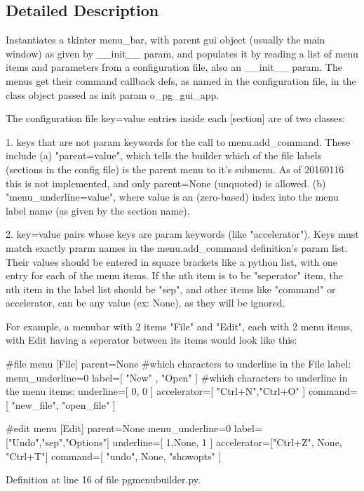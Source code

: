 \subsection{Detailed Description}
\begin{DoxyVerb}Instantiates a tkinter menu_bar, with parent gui object (usually the main window) 
as given by __init__ param, and populates it by reading a list of menu items and 
parameters from a configuration file, also an __init__ param. The menus get their 
command callback defs, as named in the configuration file, in the class object 
passed as init param o_pg_gui_app.

The configuration file key=value entries inside each [section] are of two classes:

1. keys that are not param keywords for the call to menu.add_command.  These include 
    (a) "parent=value", which tells the
    builder which of the file labels (sections in the config file) is the parent menu
    to it's submenu.  As of 20160116 this is not implemented, and only parent=None (unquoted) 
    is allowed.
    (b) "menu_underline=value", where value is an (zero-based) index into the menu label name 
    (as given by the section name).

2. key=value pairs whose keys are param keywords (like "accelerator").  Keys must match exactly
    prarm names in the menu.add_command definition's param list.  Their values should be 
    entered in square brackets like a python list, with one entry for each of the menu items.  
    If the nth item is to be "seperator" item, the nth item in the label list should be 
    "sep", and other items like "command" or accelerator, can be any value (ex: None), 
    as they will be ignored.

For example, a menubar with 2 items "File" and "Edit", each with 2 menu items, with
Edit having a seperator between its items would look like this: 

#file menu
[File]
parent=None
#which characters to underline in the File label:
menu_underline=0
label=[ "New" , "Open" ]
#which characters to underline in the menu items:
underline=[ 0, 0 ]
accelerator=[ "Ctrl+N","Ctrl+O" ]
command=[ "new_file", "open_file" ]

#edit menu
[Edit]
parent=None
menu_underline=0
label=["Undo","sep","Options"]
underline=[ 1,None, 1 ]
accelerator=["Ctrl+Z", None, "Ctrl+T"]
command=[ "undo", None, "showopts" ]  
\end{DoxyVerb}
 

Definition at line 16 of file pgmenubuilder.\+py.



